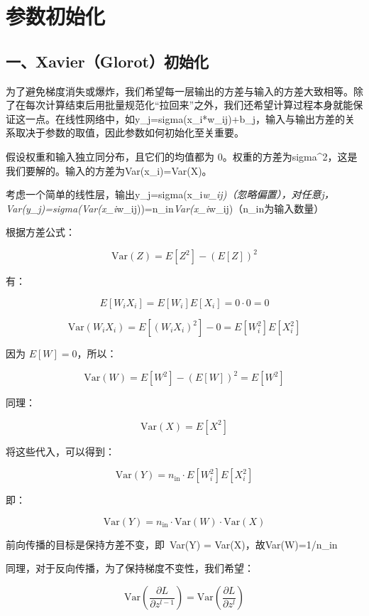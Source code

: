 \clearpage

\hypertarget{ux53c2ux6570ux521dux59cbux5316}{%
\section{参数初始化}\label{ux53c2ux6570ux521dux59cbux5316}}

\hypertarget{ux4e00xavierglorotux521dux59cbux5316}{%
\subsection{一、Xavier（Glorot）初始化}\label{ux4e00xavierglorotux521dux59cbux5316}}

为了避免梯度消失或爆炸，我们希望每一层输出的方差与输入的方差大致相等。除了在每次计算结束后用批量规范化``拉回来''之外，我们还希望计算过程本身就能保证这一点。在线性网络中，如y\_j=sigma(x\_i*w\_ij)+b\_j，输入与输出方差的关系取决于参数的取值，因此参数如何初始化至关重要。

假设权重和输入独立同分布，且它们的均值都为 0。权重的方差为sigma\^{}2，这是我们要解的。输入的方差为Var(x\_i)=Var(X)。

考虑一个简单的线性层，输出y\_j=sigma(x\_i\emph{w\_ij)（忽略偏置），对任意j，Var(y\_j)=sigma(Var(x\_i}w\_ij))=n\_in\emph{Var(x\_i}w\_ij)（n\_in为输入数量）

根据方差公式：

\[
\mathrm{Var}(Z)=E[Z^2]-(E[Z])^2
\]

有：

\[
E[W_iX_i]=E[W_i]E[X_i]=0\cdot 0=0
\]

\[
\mathrm{Var}(W_iX_i)
=E[(W_iX_i)^2]-0
=E[W_i^2]E[X_i^2]
\]

因为 \(E[W]=0\)，所以：

\[
\mathrm{Var}(W)=E[W^2]-(E[W])^2=E[W^2]
\]

同理：

\[
\mathrm{Var}(X)=E[X^2]
\]

将这些代入，可以得到：

\[
\mathrm{Var}(Y)=n_{\mathrm{in}}\cdot E[W_i^2]E[X_i^2]
\]

即：

\[
\mathrm{Var}(Y)=n_{\mathrm{in}}\cdot \mathrm{Var}(W)\cdot \mathrm{Var}(X)
\]

前向传播的目标是保持方差不变，即~Var(Y) = Var(X)，故Var(W)=1/n\_in

同理，对于反向传播，为了保持梯度不变性，我们希望：

\[
\mathrm{Var}\left(\frac{\partial L}{\partial z^{l-1}}\right)
=\mathrm{Var}\left(\frac{\partial L}{\partial z^l}\right)
\]


